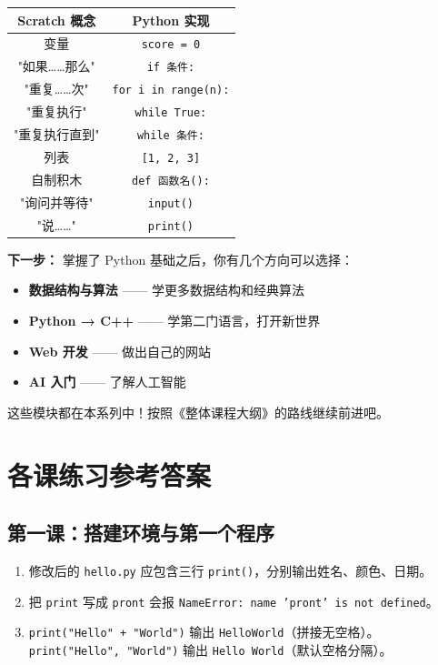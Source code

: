 \documentclass[a4paper,12pt]{ctexart}
\begin{document}
\begin{center}
\begin{tabular}{|c|c|}
\hline
\textbf{Scratch 概念} & \textbf{Python 实现} \\ \hline
变量 & \texttt{score = 0} \\ \hline
"如果……那么" & \texttt{if 条件:} \\ \hline
"重复……次" & \texttt{for i in range(n):} \\ \hline
"重复执行" & \texttt{while True:} \\ \hline
"重复执行直到" & \texttt{while 条件:} \\ \hline
列表 & \texttt{[1, 2, 3]} \\ \hline
自制积木 & \texttt{def 函数名():} \\ \hline
"询问并等待" & \texttt{input()} \\ \hline
"说……" & \texttt{print()} \\ \hline
\end{tabular}
\end{center}

\textbf{下一步：} 掌握了 Python 基础之后，你有几个方向可以选择：
\begin{itemize}
  \item \textbf{数据结构与算法} —— 学更多数据结构和经典算法
  \item \textbf{Python → C++} —— 学第二门语言，打开新世界
  \item \textbf{Web 开发} —— 做出自己的网站
  \item \textbf{AI 入门} —— 了解人工智能
\end{itemize}

这些模块都在本系列中！按照《整体课程大纲》的路线继续前进吧。

\section*{\textcolor{blue!70!black}{各课练习参考答案}}

\subsection*{第一课：搭建环境与第一个程序}
\begin{enumerate}
  \item 修改后的 \texttt{hello.py} 应包含三行 \texttt{print()}，分别输出姓名、颜色、日期。
  \item 把 \texttt{print} 写成 \texttt{pront} 会报 \texttt{NameError: name 'pront' is not defined}。
  \item \texttt{print("Hello" + "World")} 输出 \texttt{HelloWorld}（拼接无空格）。\texttt{print("Hello", "World")} 输出 \texttt{Hello World}（默认空格分隔）。
\end{enumerate}
\end{document}
